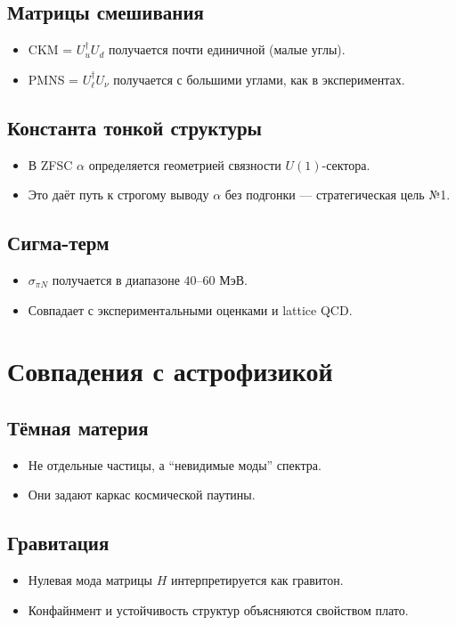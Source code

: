 \documentclass[a4paper,12pt]{article}
\begin{document}
\subsection*{Матрицы смешивания}
\begin{itemize}
  \item CKM = $U_u^\dagger U_d$ получается почти единичной (малые углы).
  \item PMNS = $U_\ell^\dagger U_\nu$ получается с большими углами, как в экспериментах.
\end{itemize}

\subsection*{Константа тонкой структуры}
\begin{itemize}
  \item В ZFSC $\alpha$ определяется геометрией связности $U(1)$-сектора.
  \item Это даёт путь к строгому выводу $\alpha$ без подгонки --- стратегическая цель №1.
\end{itemize}

\subsection*{Сигма-терм}
\begin{itemize}
  \item $\sigma_{\pi N}$ получается в диапазоне $40$--$60$ МэВ.
  \item Совпадает с экспериментальными оценками и lattice QCD.
\end{itemize}

\section*{Совпадения с астрофизикой}

\subsection*{Тёмная материя}
\begin{itemize}
  \item Не отдельные частицы, а ``невидимые моды'' спектра.
  \item Они задают каркас космической паутины.
\end{itemize}

\subsection*{Гравитация}
\begin{itemize}
  \item Нулевая мода матрицы $H$ интерпретируется как гравитон.
  \item Конфайнмент и устойчивость структур объясняются свойством плато.
\end{itemize}
\end{document}
